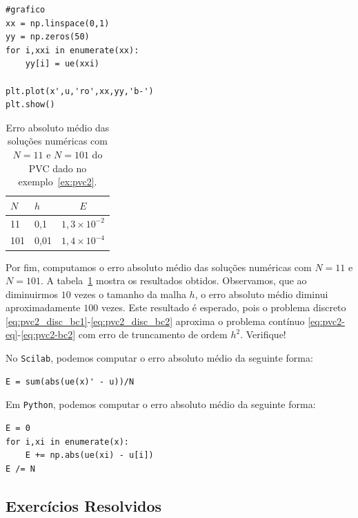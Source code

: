 \begin{sol}
\begin{verbatim}
#grafico
xx = np.linspace(0,1)
yy = np.zeros(50)
for i,xxi in enumerate(xx):
    yy[i] = ue(xxi)

plt.plot(x',u,'ro',xx,yy,'b-')
plt.show()
\end{verbatim}
\fi

\begin{table}
  \centering
  \caption{Erro absoluto médio das soluções numéricas com $N=11$ e $N=101$ do PVC dado no exemplo~\ref{ex:pvc2}.}
  \begin{tabular}{ll|c}
    $N$ & $h$ & $E$\\\hline
    11 & 0,1 & $1,3\times 10^{-2}$\\
    101 & 0,01 & $1,4\times 10^{-4}$
  \end{tabular}
  \label{tab:pvc2_erro}
\end{table}

Por fim, computamos o erro absoluto médio das soluções numéricas com $N=11$ e $N=101$. A tabela~\ref{tab:pvc2_erro} mostra os resultados obtidos. Observamos, que ao diminuirmos $10$ vezes o tamanho da malha $h$, o erro absoluto médio diminui aproximadamente $100$ vezes. Este resultado é esperado, pois o problema discreto \eqref{eq:pvc2_disc_bc1}-\eqref{eq:pvc2_disc_bc2} aproxima o problema contínuo \eqref{eq:pvc2-eq}-\eqref{eq:pvc2-bc2} com erro de truncamento de ordem $h^2$. Verifique!

\ifisscilab
No \verb+Scilab+, podemos computar o erro absoluto médio da seguinte forma:
\begin{verbatim}
E = sum(abs(ue(x)' - u))/N
\end{verbatim}
\fi
\ifispython
Em \verb+Python+, podemos computar o erro absoluto médio da seguinte forma:
\begin{verbatim}
E = 0
for i,xi in enumerate(x):
    E += np.abs(ue(xi) - u[i])
E /= N
\end{verbatim}
\fi
\end{sol}

\subsection*{Exercícios Resolvidos}

